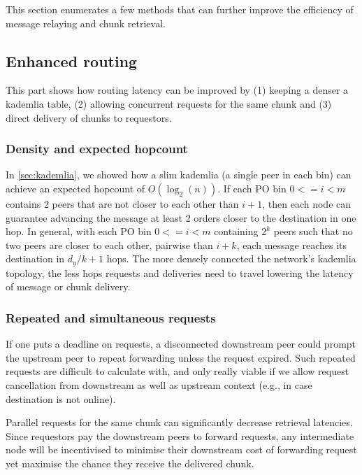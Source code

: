 This section enumerates a few methods that can further improve the efficiency of message relaying and chunk retrieval.

\subsection{Enhanced routing}

This part shows how routing latency can be improved by (1) keeping a denser a kademlia table, (2) allowing concurrent requests for the same chunk and (3) direct delivery of chunks to requestors.

\subsubsection{Density and expected hopcount}
\label{sec:bindensity}

In \ref{sec:kademlia}, we showed how a slim kademlia (a single peer in each bin) can achieve an expected  hopcount of $\mathit{O}(\log_2(n))$.
If each PO bin $0<=i<m$ contains 2 peers that are not closer to each other than $i+1$, then each node can guarantee advancing the message at least 2 orders closer to the destination in one hop.
In general, with each PO bin $0<=i<m$ containing $2^k$ peers such that no two peers are closer  to each other, pairwise than $i+k$, each message reaches its destination in $d_y/k+1$ hops. The more densely connected the network's kademlia topology, the less hops requests and deliveries need to travel lowering the latency of message or chunk delivery.

\subsubsection{Repeated and simultaneous requests}

If one puts a deadline on requests, a disconnected downstream peer could prompt the upstream peer to repeat forwarding unless the request expired.
Such repeated requests are difficult to calculate with, and only really viable if we allow request cancellation from downstream as well as upstream context (e.g., in case destination is not online).

Parallel requests for the same chunk can significantly decrease retrieval latencies. Since requestors pay the downstream peers to forward requests, any intermediate node will be incentivised to minimise their downstream cost of forwarding request yet maximise the chance they receive the delivered chunk. 

